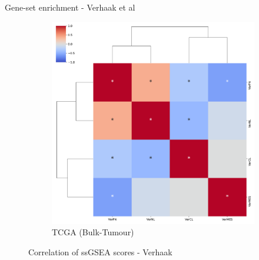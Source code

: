 \documentclass[aspectratio=169,9pt]{beamer}
\begin{document}
\begin{frame}{Gene-set enrichment - Verhaak et al}
\begin{adjustwidth}{-5cm}{-5cm}
\begin{figure}
\begin{subfigure}[c]{0.48\textwidth}
                    \includegraphics[width=\textwidth]{ssGSEA_TCGA_corrplot_Ver}
                    \caption{TCGA (Bulk-Tumour)}
                \end{subfigure}
                \caption{Correlation of ssGSEA scores - Verhaak}
            \end{figure}
        \end{adjustwidth}
    \end{frame}
\end{document}
